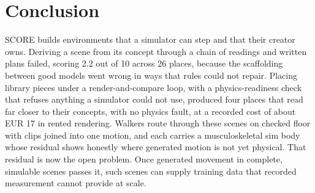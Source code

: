 \section{Conclusion}\label{conclusion}

SCORE builds environments that a simulator can step and that their creator owns. Deriving a scene from its concept through a chain of readings and written plans failed, scoring 2.2 out of 10 across 26 places, because the scaffolding between good models went wrong in ways that rules could not repair. Placing library pieces under a render-and-compare loop, with a physics-readiness check that refuses anything a simulator could not use, produced four places that read far closer to their concepts, with no physics fault, at a recorded cost of about EUR 17 in rented rendering. Walkers route through these scenes on checked floor with clips joined into one motion, and each carries a musculoskeletal sim body whose residual shows honestly where generated motion is not yet physical. That residual is now the open problem. Once generated movement in complete, simulable scenes passes it, such scenes can supply training data that recorded measurement cannot provide at scale.
